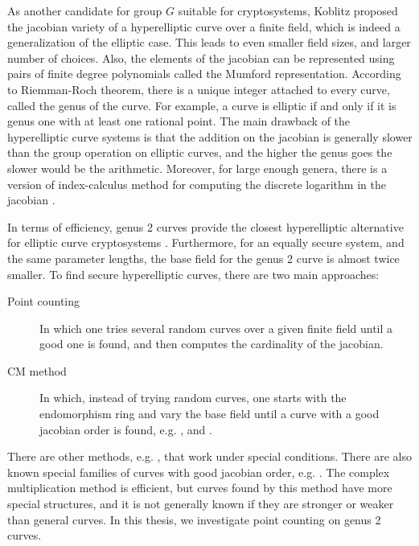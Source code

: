 
As another candidate for group $G$ suitable for cryptosystems, Koblitz \cite{Koblitz1989} proposed 
the jacobian variety of a hyperelliptic curve over a finite field, which is indeed a generalization 
of the elliptic case. This leads to even smaller field sizes, and larger number of choices. Also, 
the elements of the jacobian can be represented using pairs of finite degree polynomials called the 
Mumford representation. According to Riemman-Roch theorem, there is a unique integer attached to 
every curve, called the genus of the curve. For example, a curve is elliptic if and only if it is 
genus one with at least one rational point. The main drawback of the hyperelliptic curve systems is 
that the addition on the jacobian is generally slower than the group operation on elliptic curves, 
and the higher the genus goes the slower would be the arithmetic. Moreover, for large enough genera, 
there is a version of index-calculus method for computing the discrete logarithm in the jacobian 
\cite{Adleman1994, Enge2002, Muller1999, GaudryDL2000}. 

In terms of efficiency, genus 2 curves provide the closest hyperelliptic alternative for elliptic 
curve cryptosystems \cite{Pelzl2003, Gaudry2007, TLange2005}. Furthermore, for an equally secure 
system, and the same parameter lengths, the base field for the genus 2 curve is almost twice 
smaller. To find secure hyperelliptic curves, there are two main approaches:
\begin{description}
\item[Point counting] In which one tries several random curves over a given finite field until a 
good one is found, and then computes the cardinality of the jacobian.
\item[CM method] In which, instead of trying random curves, one starts with the endomorphism ring 
and vary the base field until a curve with a good jacobian order is found, e.g. \cite[ch. 
18]{Cohen2006}, and \cite{Weng2003}. 
\end{description}
There are other methods, e.g. \cite{Sutherland2009}, that work under special conditions. There are 
also known special families of curves with good jacobian order, e.g. \cite{Koblitz1988a}. The 
complex multiplication method is efficient, but curves found by this method have more special 
structures, and it is not generally known if they are stronger or weaker than general curves. In 
this thesis, we investigate point counting on genus 2 curves.

